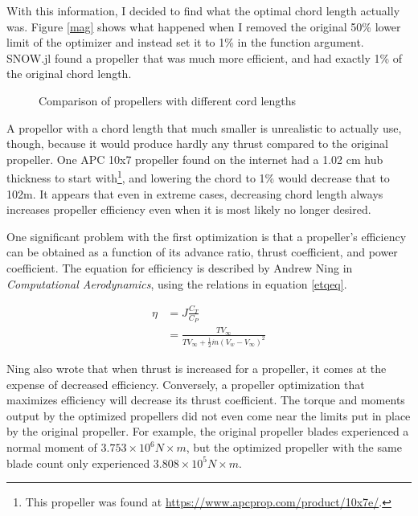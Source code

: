 \documentclass[journal ]{new-aiaa}
\begin{document}
With this information, I decided to find what the optimal chord length actually was. Figure \eqref{mag} shows what happened when I removed the original  50\% lower limit of the optimizer and instead set it to 1\% in the function argument. SNOW.jl found a propeller that was much more efficient, and had exactly 1\% of the original chord length.

\begin{figure}[H]
\centering
	
	\caption{Comparison of propellers with different cord lengths}
	\captionsetup{aboveskip=0pt,font=it}
	\label{mag}
\end{figure}

A propellor with a chord length that much smaller is unrealistic to actually use, though, because it would produce hardly any thrust compared to the original propeller. One APC 10x7 propeller found on the internet had a 1.02 cm hub thickness to start with\footnote{This propeller was found at \url{https://www.apcprop.com/product/10x7e/}.}, and lowering the chord to 1\% would decrease that to 102{\textmu}m. It appears that even in extreme cases, decreasing chord length always increases propeller efficiency even when it is most likely no longer desired.

One significant problem with the first optimization is that a propeller's efficiency can be obtained as a function of its advance ratio, thrust coefficient, and power coefficient. The equation for efficiency is described by Andrew Ning in \emph{Computational Aerodynamics}\cite{ComAer}, using the relations in equation \eqref{etqeq}.

\begin{equation}
	\begin{aligned}
	\eta & = J \frac{C_{T}}{C_{P}} \\
	& = \frac{T V_{\infty}}{T V_{\infty} + \frac{1}{2} \dot{m} (V_{w} - V_{\infty})^{2}}
	\end{aligned}
\label{etqeq}
\end{equation}

Ning also wrote that when thrust is increased for a propeller, it comes at the expense of decreased efficiency\cite{ComAer}. Conversely, a propeller optimization that maximizes efficiency will decrease its thrust coefficient. The torque and moments output by the optimized propellers did not even come near the limits put in place by the original propeller. For example, the original propeller blades experienced a normal moment of $3.753 \times 10^{6}N \times m$, but the optimized propeller with the same blade count only experienced $3.808 \times 10^{5} N \times m$.
\end{document}
